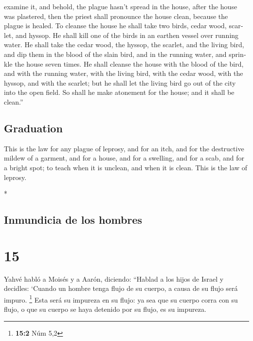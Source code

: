\begin{paracol}{2}
\begin{otherlanguage}{english}
examine it, and behold, the plague hasn't spread in the house, after the
house was plastered, then the priest shall pronounce the house clean,
because the plague is healed.  To cleanse the house he
shall take two birds, cedar wood, scarlet, and hyssop. 
He shall kill one of the birds in an earthen vessel over running water.
 He shall take the cedar wood, the hyssop, the scarlet,
and the living bird, and dip them in the blood of the slain bird, and in
the running water, and sprinkle the house seven times. 
He shall cleanse the house with the blood of the bird, and with the
running water, with the living bird, with the cedar wood, with the
hyssop, and with the scarlet;  but he shall let the
living bird go out of the city into the open field. So shall he make
atonement for the house; and it shall be clean.''

\hypertarget{graduation}{%
\subsection{Graduation}\label{graduation}}

 This is the law for any plague of leprosy, and for an
itch,  and for the destructive mildew of a garment, and
for a house,  and for a swelling, and for a scab, and for
a bright spot;  to teach when it is unclean, and when it
is clean. This is the law of leprosy.

\end{otherlanguage}

\switchcolumn[0]*

\hypertarget{inmundicia-de-los-hombres}{%
\subsection{Inmundicia de los hombres}\label{inmundicia-de-los-hombres}}

\hypertarget{section-28}{%
\section{15}\label{section-28}}

 Yahvé habló a Moisés y a Aarón, diciendo: 
``Hablad a los hijos de Israel y decidles: `Cuando un hombre tenga flujo
de su cuerpo, a causa de su flujo será impuro. \footnote{\textbf{15:2}
  Núm 5,2}  Esta será su impureza en su flujo: ya sea que
su cuerpo corra con su flujo, o que su cuerpo se haya detenido por su
flujo, es su impureza.


\end{paracol}
